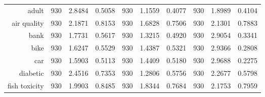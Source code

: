 \begin{table}[H]
{\begin{tabular}{rccccccccc}
			adult                               & 930                                         & 2.8484                                                                    & 0.5058          & 930            & \cellcolor[rgb]{ .776,  .937,  .808}\textcolor[rgb]{ 0,  .38,  0}{1.1559}          & 0.4077          & 930            & 1.8989          & 0.4104          \\
			air quality                         & 930                                         & 2.1871                                                                    & 0.8153          & 930            & \cellcolor[rgb]{ .776,  .937,  .808}\textcolor[rgb]{ 0,  .38,  0}{1.6828}          & 0.7506          & 930            & 2.1301          & 0.7883          \\
			bank                                & 930                                         & 1.7731                                                                    & 0.5617          & 930            & \cellcolor[rgb]{ .776,  .937,  .808}\textcolor[rgb]{ 0,  .38,  0}{1.3215}          & 0.4920          & 930            & 2.9054          & 0.3341          \\
			bike                                & 930                                         & 1.6247                                                                    & 0.5529          & 930            & \cellcolor[rgb]{ .776,  .937,  .808}\textcolor[rgb]{ 0,  .38,  0}{1.4387}          & 0.5321          & 930            & 2.9366          & 0.2808          \\
			car                                 & 930                                         & 1.5903                                                                    & 0.5113          & 930            & \cellcolor[rgb]{ .776,  .937,  .808}\textcolor[rgb]{ 0,  .38,  0}{1.4409}          & 0.5180          & 930            & 2.9688          & 0.2275          \\
			diabetic                            & 930                                         & 2.4516                                                                    & 0.7353          & 930            & \cellcolor[rgb]{ .776,  .937,  .808}\textcolor[rgb]{ 0,  .38,  0}{1.2806}          & 0.5756          & 930            & 2.2677          & 0.5798          \\
			fish toxicity                       & 930                                         & 1.9903                                                                    & 0.8485          & 930            & \cellcolor[rgb]{ .776,  .937,  .808}\textcolor[rgb]{ 0,  .38,  0}{1.8344}          & 0.7684          & 930            & 2.1753          & 0.7959          \\

\end{tabular}}
\end{table}
